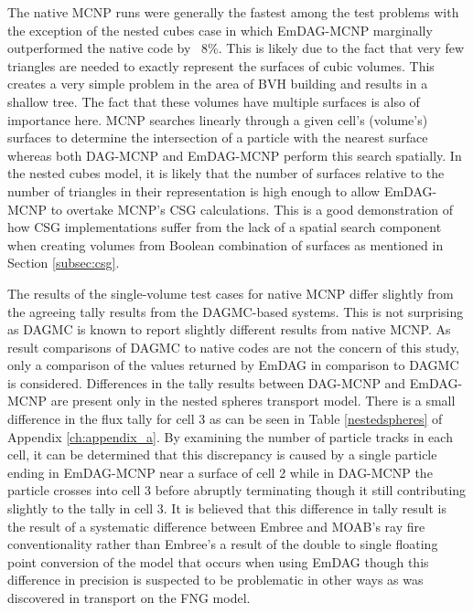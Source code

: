 The native MCNP runs were generally the fastest among the test problems with the
exception of the nested cubes case in which EmDAG-MCNP marginally outperformed
the native code by ~8\%. This is likely due to the fact that very few triangles
are needed to exactly represent the surfaces of cubic volumes. This creates a
very simple problem in the area of BVH building and results in a shallow
tree. The fact that these volumes have multiple surfaces is also of importance
here. MCNP searches linearly through a given cell's (volume's) surfaces to
determine the intersection of a particle with the nearest surface whereas both
DAG-MCNP and EmDAG-MCNP perform this search spatially. In the nested cubes
model, it is likely that the number of surfaces relative to the number of
triangles in their representation is high enough to allow EmDAG-MCNP to overtake
MCNP's CSG calculations. This is a good demonstration of how CSG implementations
suffer from the lack of a spatial search component when creating volumes from
Boolean combination of surfaces as mentioned in Section \ref{subsec:csg}.


The results of the single-volume test cases for native MCNP differ slightly from
the agreeing tally results from the DAGMC-based systems. This is not surprising
as DAGMC is known to report slightly different results from native MCNP. As
result comparisons of DAGMC to native codes are not the concern of this study,
only a comparison of the values returned by EmDAG in comparison to DAGMC is
considered. Differences in the tally results between DAG-MCNP and EmDAG-MCNP are
present only in the nested spheres transport model. There is a small difference
in the flux tally for cell 3 as can be seen in Table \ref{nestedspheres} of
Appendix \ref{ch:appendix_a}. By examining the number of particle tracks in each
cell, it can be determined that this discrepancy is caused by a single particle
ending in EmDAG-MCNP near a surface of cell 2 while in DAG-MCNP the particle
crosses into cell 3 before abruptly terminating though it still contributing
slightly to the tally in cell 3. It is believed that this difference in tally
result is the result of a systematic difference between Embree and MOAB's ray
fire conventionality rather than Embree's a result of the double to single
floating point conversion of the model that occurs when using EmDAG though this
difference in precision is suspected to be problematic in other ways as was
discovered in transport on the FNG model.

